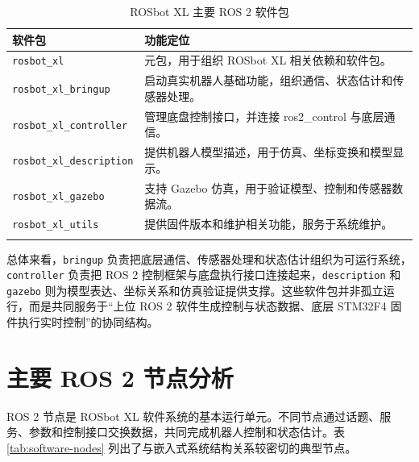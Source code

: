 \documentclass[UTF8,a4paper,12pt]{ctexrep}
\begin{document}
\begin{table}[H]
  \centering
  \caption{ROSbot XL 主要 ROS 2 软件包}
  \label{tab:software-packages}
  \small
  \begin{tabularx}{\textwidth}{L{4.8cm}Y}
    \toprule
    \textbf{软件包} & \textbf{功能定位} \\
    \midrule
    \texttt{rosbot\_xl} & 元包，用于组织 ROSbot XL 相关依赖和软件包。 \\
    \texttt{rosbot\_xl\_bringup} & 启动真实机器人基础功能，组织通信、状态估计和传感器处理。 \\
    \texttt{rosbot\_xl\_controller} & 管理底盘控制接口，并连接 ros2\_control 与底层通信。 \\
    \texttt{rosbot\_xl\_description} & 提供机器人模型描述，用于仿真、坐标变换和模型显示。 \\
    \texttt{rosbot\_xl\_gazebo} & 支持 Gazebo 仿真，用于验证模型、控制和传感器数据流。 \\
    \texttt{rosbot\_xl\_utils} & 提供固件版本和维护相关功能，服务于系统维护。 \\
    \bottomrule
  \end{tabularx}
\end{table}

总体来看，\texttt{bringup} 负责把底层通信、传感器处理和状态估计组织为可运行系统，\texttt{controller} 负责把 ROS 2 控制框架与底盘执行接口连接起来，\texttt{description} 和 \texttt{gazebo} 则为模型表达、坐标关系和仿真验证提供支撑。这些软件包并非孤立运行，而是共同服务于“上位 ROS 2 软件生成控制与状态数据、底层 STM32F4 固件执行实时控制”的协同结构。

\section{主要 ROS 2 节点分析}

ROS 2 节点是 ROSbot XL 软件系统的基本运行单元。不同节点通过话题、服务、参数和控制接口交换数据，共同完成机器人控制和状态估计。表 \ref{tab:software-nodes} 列出了与嵌入式系统结构关系较密切的典型节点。
\end{document}
